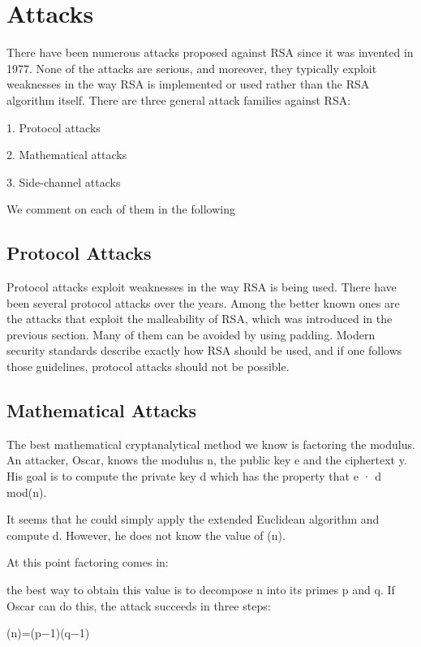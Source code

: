 \documentclass{article}
\begin{document}
\section{Attacks}

There have been numerous attacks proposed against RSA since it was invented in
1977. None of the attacks are serious, and moreover, they typically exploit weaknesses in the way RSA is implemented or used rather than the RSA algorithm itself.
There are three general attack families against RSA:


1. Protocol attacks


2. Mathematical attacks


3. Side-channel attacks


We comment on each of them in the following



\subsection{Protocol Attacks}


Protocol attacks exploit weaknesses in the way RSA is being used. There have been
several protocol attacks over the years. Among the better known ones are the attacks
that exploit the malleability of RSA, which was introduced in the previous section.
Many of them can be avoided by using padding. Modern security standards describe
exactly how RSA should be used, and if one follows those guidelines, protocol
attacks should not be possible.


\subsection{Mathematical Attacks}

The best mathematical cryptanalytical method we know is factoring the modulus.
An attacker, Oscar, knows the modulus n, the public key e and the ciphertext y. His
goal is to compute the private key d which has the property that e · d \equiv mod\phi(n).

It seems that he could simply apply the extended Euclidean algorithm and compute d. 
However, he does not know the value of \phi(n). 

At this point factoring comes in:

the best way to obtain this value is to decompose n into its primes p and q. 
If Oscar can do this, the attack succeeds in three steps:


\phi(n)=(p−1)(q−1)
\end{document}
